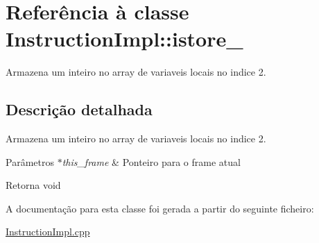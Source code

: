 \hypertarget{class_instruction_impl_1_1istore__2}{}\section{Referência à classe Instruction\+Impl\+:\+:istore\+\_}
\label{class_instruction_impl_1_1istore__2}


Armazena um inteiro no array de variaveis locais no indice 2.  




\subsection{Descrição detalhada}
Armazena um inteiro no array de variaveis locais no indice 2. 


\begin{DoxyParams}{Parâmetros}
{\em $\ast$this\+\_\+frame} & Ponteiro para o frame atual \\
\hline
\end{DoxyParams}
\begin{DoxyReturn}{Retorna}
void 
\end{DoxyReturn}


A documentação para esta classe foi gerada a partir do seguinte ficheiro\+:\begin{DoxyCompactItemize}
\item 
\hyperlink{_instruction_impl_8cpp}{Instruction\+Impl.\+cpp}\end{DoxyCompactItemize}
